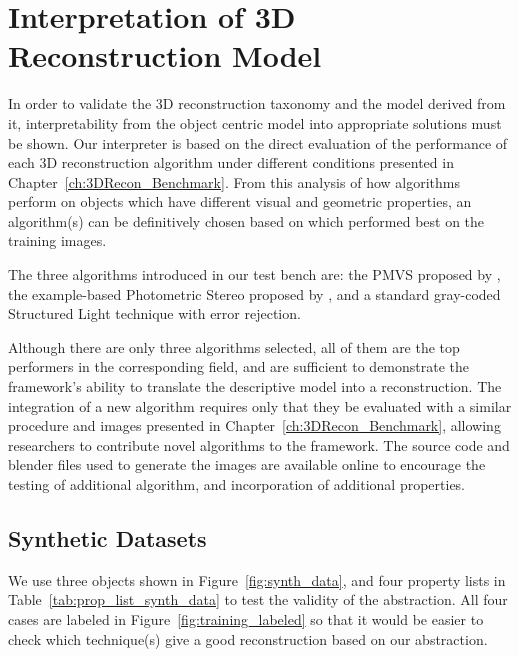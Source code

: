 
\chapter{Interpretation of 3D Reconstruction Model}
\label{ch:3DRecon_Interp}
In order to validate the 3D reconstruction taxonomy and the model derived from it, interpretability from the object centric model into appropriate solutions must be shown. Our interpreter is based on the direct evaluation of the performance of each 3D reconstruction algorithm under different conditions presented in Chapter~\ref{ch:3DRecon_Benchmark}. From this analysis of how algorithms perform on objects which have different visual and geometric properties, an algorithm(s) can be definitively chosen based on which performed best on the training images.

The three algorithms introduced in our test bench are: the PMVS proposed by \citeauthor{furukawa2010accurate}, the example-based Photometric Stereo proposed by \citeauthor{hertzmann2005example}, and a standard gray-coded Structured Light technique with error rejection.

Although there are only three algorithms selected, all of them are the top performers in the corresponding field, and are sufficient to demonstrate the framework's ability to translate the descriptive model into a reconstruction. The integration of a new algorithm requires only that they be evaluated with a similar procedure and images presented in Chapter~\ref{ch:3DRecon_Benchmark}, allowing researchers to contribute novel algorithms to the framework. The source code and blender files used to generate the images are available online to encourage the testing of additional algorithm, and incorporation of additional properties.

\section{Synthetic Datasets}
We use three objects shown in Figure~\ref{fig:synth_data}, and four property lists in Table~\ref{tab:prop_list_synth_data} to test the validity of the abstraction. All four cases are labeled in Figure~\ref{fig:training_labeled} so that it would be easier to check which technique(s) give a good reconstruction based on our abstraction.

